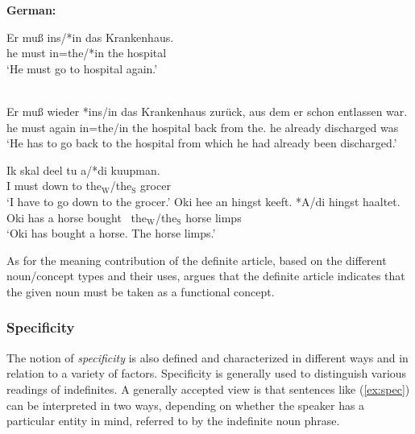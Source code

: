 \documentclass[output=paper]{langsci/langscibook}
\begin{document}
\newpage
\begin{exe}
\ex\label{ex:loebner.exs}
{\textbf{German:}}
	\begin{xlista}
	\ex
	\gll Er {mu\ss} {ins/*in das} Krankenhaus.\\			
	he must {in=the/*in the} hospital\\
	\glt `He must go to hospital again.'\\\ 
	\hfill\citep[from][ex.52, our glosses]{lobner:85}
	
	\ex
	\gll Er {mu\ss} wieder {*ins/in das} Krankenhaus zurück, aus dem er schon entlassen war.\\
	he must again {in=the/in the} hospital back from the.{\sc{dat}} he already discharged was\\
	\glt `He has to go back to the hospital from which he had already been discharged.' \hfill\citep[from][ex.54, our glosses]{lobner:85}
	\end{xlista}
\end{exe}

\begin{exe}
\ex {\textbf{Fering (F\"ohr):}} \hfill\citep[][p.161]{ebert:71}
	\begin{xlista}
	\ex
	\gll Ik skal deel tu a/*di kuupman. \\
	I must down to the$_{\text{W}}$/the$_{\text{S}}$ grocer \\
	\glt `I have to go down to the grocer.'
	\ex
	\gll Oki hee an hingst keeft. *A/di hingst haaltet. \\
	Oki has a horse bought \ the$_{\text{W}}$/the$_{\text{S}}$ horse limps \\
	\glt `Oki has bought a horse. The horse limps.'	
	\end{xlista}
\end{exe}

As for the meaning contribution of the definite article, based on the different noun/concept types and their uses, \citet{lobner:85} argues that the definite article indicates that the given noun must be taken as a functional concept. 

\subsubsection{Specificity}
The notion of {\emph{specificity}} \citep[see, e.\,g.,][]{vonheus:11} is also defined and characterized in different ways and in relation to a variety of factors. Specificity is generally used to distinguish various readings of indefinites. A generally accepted view is that sentences like (\ref{ex:spec}) can be interpreted in two ways, depending on whether the speaker has a particular entity in mind, referred to by the indefinite noun phrase.
\end{document}

